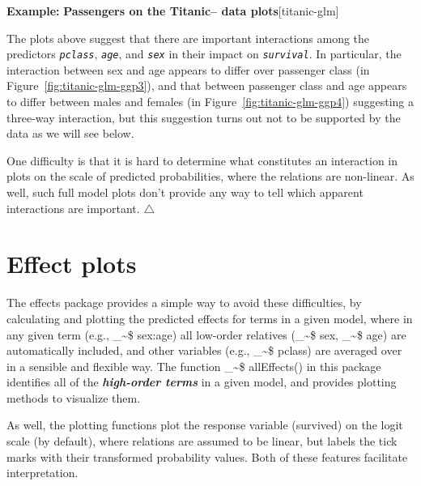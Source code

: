 \documentclass{article}
\makeatletter
\newcommand{\figref}[1]{Figure~\ref{#1}}
\newcommand{\var}[1]{\textit{\texttt{#1}}}
\newcommand\code{\bgroup\@makeother\_\@makeother\~\@makeother\$\@codex}
\def\@codex#1{{\normalfont\ttfamily\hyphenchar\font=-1 #1}\egroup}
\newcommand{\func}[1]{\code{#1()}}
\newcommand{\pkg}[1]{\textsf{#1}\nocite{R-#1}}
\newcommand{\Rpackage}[1]{\pkg{#1} package}
\newcommand{\term}[1]{\textit{\textbf{#1}}}
\newenvironment{Example}[2][unnamed-example]%
  {\medskip\noindent\textbf{\textsf{Example:}}
   \textbf{#2}\hfill [#1]\par\smallskip
  }
  {\hfill $\triangle$}
\makeatother
\begin{document}
\begin{Example}[titanic-glm]{Passengers on the Titanic-- data plots}
The plots above suggest that there are important interactions among the
predictors \var{pclass}, \var{age}, and \var{sex} in their impact on
\var{survival}. In particular, the interaction between 
sex and age appears to differ over passenger class (in \figref{fig:titanic-glm-ggp3}),
and that between passenger class
and age appears to differ between males and females (in \figref{fig:titanic-glm-ggp4})
suggesting a three-way interaction, but this suggestion turns out not to
be supported by the data as we will see below.

One difficulty is that it is hard to determine what constitutes an interaction
 in plots on
the scale of predicted probabilities, where the relations are non-linear. 
As well, such full model plots don't provide any way to tell which apparent
interactions are important.
\end{Example}

\section{Effect plots}

The \Rpackage{effects} provides a simple way to avoid these difficulties,
by calculating and plotting the predicted effects for terms in a given
model, where in any given term (e.g., \code{sex:age}) all low-order relatives
(\code{sex}, \code{age}) are automatically included, and other variables
(e.g., \code{pclass}) are averaged over in a sensible and flexible way.
The function \func{allEffects} in this package identifies all of the
\term{high-order terms} in a given model, and provides plotting methods to visualize
them.  

As well, the plotting functions plot the response variable
(survived) on the logit scale (by default), where relations are assumed to be linear,
but labels the tick marks with their transformed probability values.
Both of these features facilitate interpretation.
\end{document}
